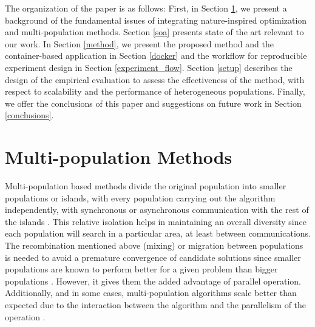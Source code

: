 \documentclass[review]{elsarticle}
\begin{document}
The organization of the paper is as follows: First, in Section \ref{multi}, we present a
background of the fundamental issues of integrating nature-inspired optimization
and multi-population methods. Section \ref{soa} presents state of the art relevant to
our work. In Section \ref{method}, we present the proposed method and the container-based
application in Section \ref{docker} and the workflow for reproducible experiment design in Section \ref{experiment_flow}. %
Section \ref{setup} describes the design of the empirical evaluation to assess the effectiveness
of the method,  with respect to scalability and %
the performance of heterogeneous populations.  %
Finally, we offer the conclusions of this paper and suggestions on future work in Section \ref{conclusions}.


\section{Multi-population Methods} %
\label{multi}

Multi-population based methods divide the original population into
smaller populations or islands, with every population carrying out the
algorithm independently, with synchronous or asynchronous communication with the
rest of the islands \cite{Ma2019}.%
This relative isolation helps in maintaining an overall
diversity since each population will search in a particular area, at least
between communications. The recombination mentioned above (mixing) or migration
between populations is needed to avoid a premature convergence of candidate
solutions since smaller populations are known to perform better for a given
problem than bigger populations \cite{li2016multi,wu2016differential}. %
However, it gives them the added advantage of
parallel operation. Additionally, and in some cases, multi-population algorithms
scale better than expected due to the interaction between the algorithm and the
parallelism of the operation \cite{ALBA20027}. %
\end{document}
